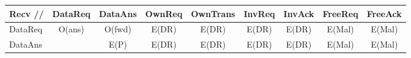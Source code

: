 \documentclass{standalone}
\begin{document}
\begin{tabular}{|l|*8{c|}}\hline
	\textbf{Recv //} & DataReq & DataAns & OwnReq & OwnTrans & InvReq & InvAck & FreeReq & FreeAck \\\hline
	DataReq          & O(ans)  & O(fwd)  & E(DR)  & E(DR)    & E(DR)  & E(DR)  & E(Mal)  & E(Mal)  \\\hline
	DataAns          &         & E(P)    & E(DR)  & E(DR)    & E(DR)  & E(DR)  & E(Mal)  & E(Mal)  \\\hline
\end{tabular}
\end{document}
